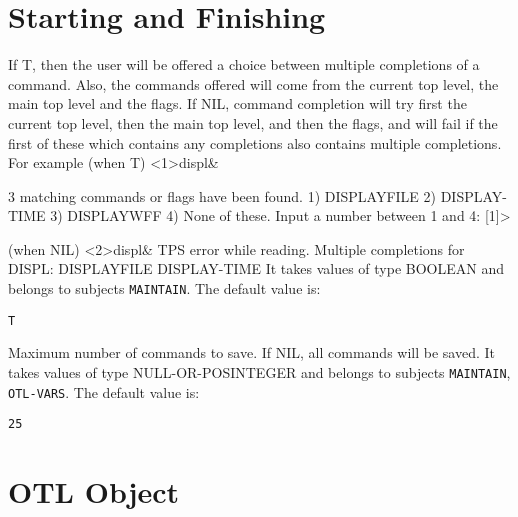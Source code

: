 \section{Starting and Finishing}

\begin{description} 
\item[COMPLETION-OPTIONS]  
If T, then the user will be offered a choice between
multiple completions of a command. Also, the commands offered 
will come from the current top level, the main top level and the 
flags.
If NIL, command completion will try first the current top level,
then the main top level, and then the flags, and will fail if the 
first of these which contains any completions also contains
multiple completions.
For example (when T)
<1>displ\&  

3 matching commands or flags have been found.
1) DISPLAYFILE
2) DISPLAY-TIME
3) DISPLAYWFF
4) None of these.
Input a number between 1 and 4: [1]>

(when NIL)
<2>displ\&  
TPS error while reading.
Multiple completions for DISPL: DISPLAYFILE DISPLAY-TIME 
It takes values of type BOOLEAN and belongs to subjects \texttt{MAINTAIN}.  The default value is: \begin{lstlisting}
T
\end{lstlisting}

\item[HISTORY-SIZE]  
Maximum number of commands to save. If NIL, all commands
will be saved.
It takes values of type NULL-OR-POSINTEGER and belongs to subjects \texttt{MAINTAIN}, \texttt{OTL-VARS}.  The default value is: \begin{lstlisting}
25
\end{lstlisting}

\item
\end{description}

\section{OTL Object}

